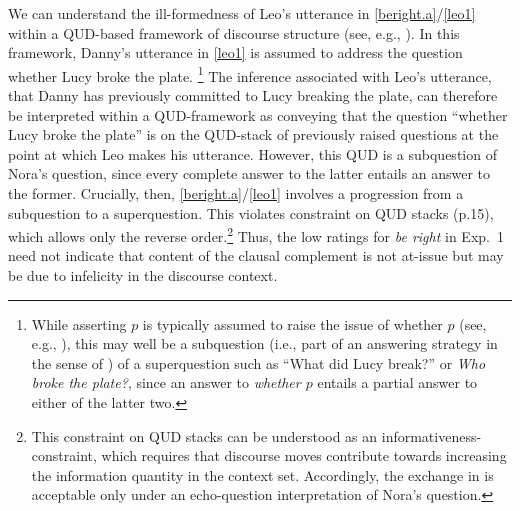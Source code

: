 \documentclass[times,linguex]{glossa}
\begin{document}
We can understand the ill-formedness of Leo's utterance in  \ref{beright.a}/\ref{leo1} within a QUD-based framework of discourse structure (see, e.g., \citealt{ginzburg_interrogatives_1996,roberts_information_2012,buring_d-trees_2003}). In this framework, Danny's utterance in \ref{leo1} is assumed to address the question whether Lucy broke the plate.%
\footnote{While asserting $p$ is typically assumed to raise the issue of whether $p$ (see, e.g., \citealt{ginzburg_interrogative_2000,farkas_reacting_2010}), this may well be a subquestion (i.e., part of an answering strategy in the sense of \citealp{roberts_information_2012}) of a superquestion such as \enquote{What did Lucy break?} or \emph{Who broke the plate?}, since an answer to \emph{whether $p$} entails a partial answer to either of the latter two.
}
The inference associated with Leo's utterance, that Danny has previously committed to Lucy breaking the plate, can therefore be interpreted within a QUD-framework as conveying that the question \enquote{whether Lucy broke the plate} is on the QUD-stack of previously raised questions at the point at which Leo makes his utterance. However, this QUD is a subquestion of Nora's question, since every complete answer to the latter entails an answer to the former. Crucially, then, \ref{beright.a}/\ref{leo1} involves a progression from a subquestion to a superquestion. This violates  constraint on QUD stacks (p.15), which allows only the reverse order.\footnote{This constraint on QUD stacks can be understood as an informativeness-constraint, which requires that discourse moves contribute towards increasing the information quantity in the context set. Accordingly, the exchange in \Last is acceptable only under an echo-question interpretation of Nora's question.} Thus, the low ratings for \emph{be right} in Exp.~1 need not indicate that content of the clausal complement is not at-issue but may be due to infelicity in the discourse context.%
\end{document}
